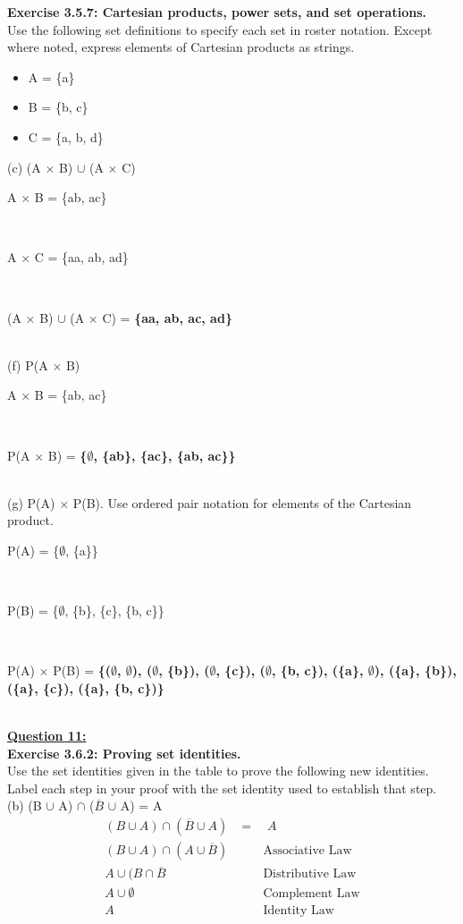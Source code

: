 \documentclass[12pt, letterpaper, twoside]{article}
\begin{document}
\newpage
\noindent\textbf{Exercise 3.5.7: Cartesian products, power sets, and set operations.}\\
Use the following set definitions to specify each set in roster notation. Except where noted, express elements of Cartesian products as strings.
\begin{itemize}[noitemsep]
\item A = \{a\}
\item B = \{b, c\}
\item C = \{a, b, d\}
\end{itemize}
(c) (A $\times$ B) $\cup$ (A $\times$ C)\\
\break
\centerline{A $\times$ B = \{ab, ac\}}\\
\centerline{A $\times$ C = \{aa, ab, ad\}}\\
\centerline{(A $\times$ B) $\cup$ (A $\times$ C) = \textbf{\{aa, ab, ac, ad\}}}\\
\break
(f) P(A $\times$ B)\\
\break
\centerline{A $\times$ B = \{ab, ac\}}\\
\centerline{P(A $\times$ B) = \textbf{\{$\emptyset$, \{ab\}, \{ac\}, \{ab, ac\}\}}}\\
\break
(g) P(A) $\times$ P(B). Use ordered pair notation for elements of the Cartesian product.\\
\break
\centerline{P(A) = \{$\emptyset$, \{a\}\}}\\
\centerline{P(B) = \{$\emptyset$, \{b\}, \{c\}, \{b, c\}\}}\\
\centerline{P(A) $\times$ P(B) = \textbf{\{($\emptyset$, $\emptyset$), ($\emptyset$, \{b\}), ($\emptyset$, \{c\}), ($\emptyset$, \{b, c\}), (\{a\}, $\emptyset$), (\{a\}, \{b\}), (\{a\}, \{c\}), (\{a\}, \{b, c\})\}}}\\
\break
\newpage
\noindent \textbf{\underline{Question 11:}}\\
\textbf{Exercise 3.6.2: Proving set identities.}\\
Use the set identities given in the table to prove the following new identities. Label each step in your proof with the set identity used to establish that step.\\
\break
(b) (B $\cup$ A) $\cap$ ($\overline{B}$ $\cup$ A) = A\\
\begin{align*}
(B \cup A) \cap (\overline{B} \cup A) &= \quad A\\
(B \cup A) \cap (A \cup \overline{B}) & \qquad\text{Associative Law}\\
A \cup (B \cap \overline{B} & \qquad\text{Distributive Law}\\
A \cup \emptyset & \qquad\text{Complement Law}\\
A & \qquad\text{Identity Law}\\
\end{align*}
\end{document}

